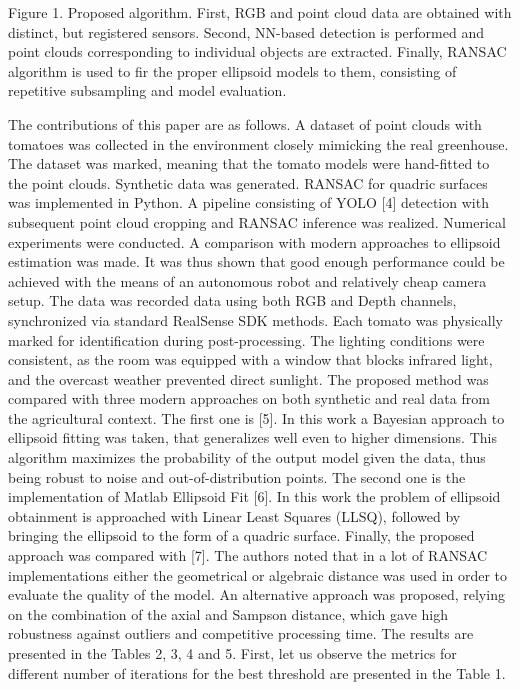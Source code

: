 Figure 1. Proposed algorithm. First, RGB and point cloud data are obtained with distinct, but registered sensors. Second, NN-based detection is performed and point clouds corresponding to individual objects are extracted. Finally, RANSAC algorithm is used to fir the proper ellipsoid models to them, consisting of repetitive subsampling and model evaluation.

The contributions of this paper are as follows. A dataset of point clouds with tomatoes was collected in the environment closely mimicking the real greenhouse. The dataset was marked, meaning that the tomato models were hand-fitted to the point clouds. Synthetic data was generated. RANSAC for quadric surfaces was implemented in Python. A pipeline consisting of YOLO [4] detection with subsequent point cloud cropping and RANSAC inference was realized. Numerical experiments were conducted. A comparison with modern approaches to ellipsoid estimation was made. It was thus shown that good enough performance could be achieved with the means of an autonomous robot and relatively cheap camera setup. 
The data was recorded data using both RGB and Depth channels, synchronized via standard RealSense SDK methods. Each tomato was physically marked for identification during post-processing.
The lighting conditions were consistent, as the room was equipped with a window that blocks infrared light, and the overcast weather prevented direct sunlight.
	The proposed method was compared with three modern approaches on both synthetic and real data from the agricultural context. The first one is [5]. In this work a Bayesian approach to ellipsoid fitting was taken, that generalizes well even to higher dimensions. This algorithm maximizes the probability of the output model given the data, thus being robust to noise and out-of-distribution points. The second one is the implementation of Matlab Ellipsoid Fit [6]. In this work the problem of ellipsoid obtainment is approached with Linear Least Squares (LLSQ), followed by bringing the ellipsoid to the form of a quadric surface. Finally, the proposed approach was compared with [7]. The authors noted that in a lot of RANSAC implementations either the geometrical or algebraic distance was used in order to evaluate the quality of the model. An alternative approach was proposed, relying on the combination of the axial and Sampson distance, which gave high robustness against outliers and competitive processing time.
The results are presented in the Tables 2, 3, 4 and 5. First, let us observe the metrics for different number of iterations for the best threshold are presented in the Table 1.


